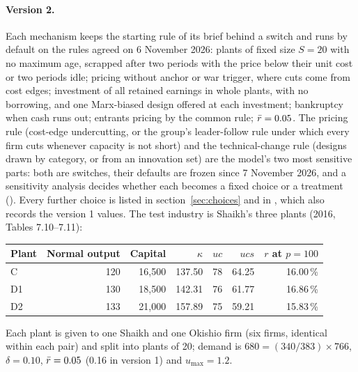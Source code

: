 \paragraph{Version 2.} Each mechanism keeps the starting rule of its brief behind a switch
and runs by default on the rules agreed on 6 November 2026: plants of fixed size $S = 20$
with no maximum age, scrapped after two periods with the price below their unit cost or
two periods idle; pricing without anchor or war trigger, where cuts come from cost edges;
investment of all retained earnings in whole plants, with no borrowing, and one
Marx-biased design offered at each investment; bankruptcy when cash runs out; entrants
pricing by the common rule; $\bar r = 0.05$. The pricing rule (cost-edge undercutting, or
the group's leader-follow rule under which every firm cuts whenever capacity is not short)
and the technical-change rule (designs drawn by category, or from an innovation set) are
the model's two most sensitive parts: both are switches, their defaults are frozen since
7 November 2026, and a sensitivity analysis decides whether each becomes a fixed choice or
a treatment (). Every further choice is listed in
section~\ref{sec:choices} and in , which also records the
version 1 values. The test industry is Shaikh's three plants (2016, Tables 7.10--7.11):

\begin{center}
\begin{tabular}{lrrrrrr}
\toprule
Plant & Normal output & Capital & $\kappa$ & $uc$ & $ucs$ & $r$ at $p = 100$ \\
\midrule
C  & 120 & 16{,}500 & 137.50 & 78 & 64.25 & 16.00\,\% \\
D1 & 130 & 18{,}500 & 142.31 & 76 & 61.77 & 16.86\,\% \\
D2 & 133 & 21{,}000 & 157.89 & 75 & 59.21 & 15.83\,\% \\
\bottomrule
\end{tabular}
\end{center}

Each plant is given to one Shaikh and one Okishio firm (six firms, identical within each
pair) and split into plants of 20; demand is $680 = (340/383)\times 766$, $\delta = 0.10$,
$\bar r = 0.05$ (0.16 in version 1) and $u_{\max} = 1.2$.

